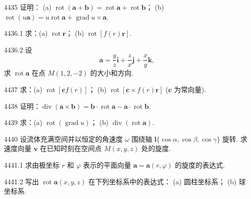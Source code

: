 \begin{prob}[M]{4435}
证明：
(a) $\operatorname{rot}(\boldsymbol{a} + \boldsymbol{b}) = \operatorname{rot} \boldsymbol{a} + \operatorname{rot} \boldsymbol{b}$； \qquad (b) $\operatorname{rot}(u\boldsymbol{a}) = u \operatorname{rot} \boldsymbol{a} + \operatorname{grad} u \times \boldsymbol{a}$.
\end{prob}

\begin{prob}[M]{4436.1}
求：(a) $\operatorname{rot} \boldsymbol{r}$； \qquad (b) $\operatorname{rot}[f(r)\boldsymbol{r}]$.
\end{prob}

\begin{prob}[M]{4436.2}
设
\[
\boldsymbol{a} = \frac{y}{z}\boldsymbol{i} + \frac{z}{x}\boldsymbol{j} + \frac{x}{y}\boldsymbol{k},
\]
求 $\operatorname{rot} \boldsymbol{a}$ 在点 $M(1, 2, -2)$ 的大小和方向.
\end{prob}

\begin{prob}[M]{4437}
求：(a) $\operatorname{rot}[\boldsymbol{c} f(r)]$； \qquad (b) $\operatorname{rot}[\boldsymbol{c} \times f(r)\boldsymbol{r}]$ ($\boldsymbol{c}$ 为常向量).
\end{prob}

\begin{prob}[M]{4438}
证明：$\operatorname{div}(\boldsymbol{a} \times \boldsymbol{b}) = \boldsymbol{b} \cdot \operatorname{rot} \boldsymbol{a} - \boldsymbol{a} \cdot \operatorname{rot} \boldsymbol{b}$.
\end{prob}

\begin{prob}[M]{4439}
求：(a) $\operatorname{rot}(\operatorname{grad} u)$； \qquad (b) $\operatorname{div}(\operatorname{rot} \boldsymbol{a})$.
\end{prob}

\begin{prob}[M]{4440}
设流体充满空间并以恒定的角速度 $\omega$ 围绕轴 $\boldsymbol{l}\{\cos\alpha, \cos\beta, \cos\gamma\}$ 旋转. 求速度向量 $\boldsymbol{v}$ 在已知时刻在空间点 $M(x, y, z)$ 处的旋度.
\end{prob}

\begin{prob}[M]{4441.1}
求由极坐标 $r$ 和 $\varphi$ 表示的平面向量 $\boldsymbol{a} = \boldsymbol{a}(r, \varphi)$ 的旋度的表达式.
\end{prob}

\begin{prob}[M]{4441.2}
写出 $\operatorname{rot} \boldsymbol{a}(x, y, z)$ 在下列坐标系中的表达式：
(a) 圆柱坐标系； \qquad (b) 球坐标系.
\end{prob}

